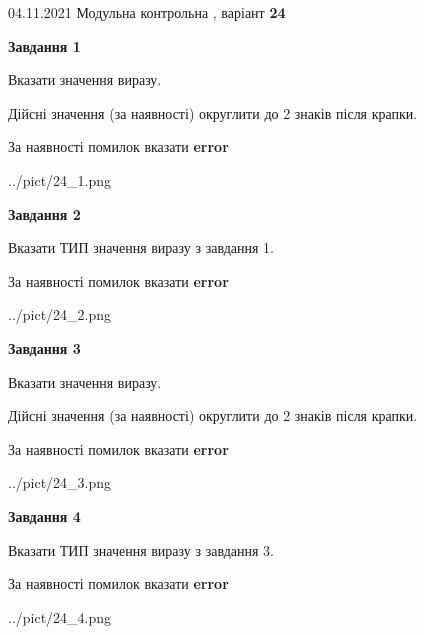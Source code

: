 \documentclass[11pt, ukrainian]{article}
\begin{document}
{04.11.2021 Модульна контрольна , варіант  \No \textbf { 24 }\par}
{
\begin {large}
{\begin {center}\textbf{Завдання 1}\end {center}}\par
Вказати значення виразу. \par
Дійсні значення (за наявності) округлити до 2 знаків після крапки. \par
За наявності помилок вказати \textbf{error}

\begin{center}
	{../pict/24_1.png}
\end{center}
\newpage

{\begin {center}\textbf{Завдання 2}\end {center}}\par
Вказати ТИП значення виразу з завдання 1. \par
За наявності помилок вказати \textbf{error}

\begin{center}
	{../pict/24_2.png}
\end{center}
\newpage

{\begin {center}\textbf{Завдання 3}\end {center}}\par
Вказати значення виразу. \par
Дійсні значення (за наявності) округлити до 2 знаків після крапки. \par
За наявності помилок вказати \textbf{error}

\begin{center}
	{../pict/24_3.png}
\end{center}
\newpage

{\begin {center}\textbf{Завдання 4}\end {center}}\par
Вказати ТИП значення виразу з завдання 3. \par
За наявності помилок вказати \textbf{error}

\begin{center}
	{../pict/24_4.png}
\end{center}
\newpage


\end{large}}
\end{document}
